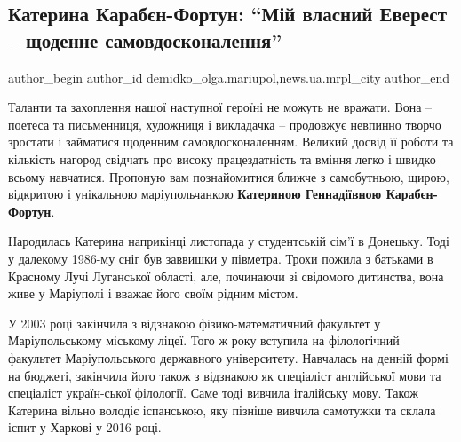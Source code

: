  
 
 
 
 
 
\subsection{Катерина Карабєн-Фортун: \enquote{Мій власний Еверест – щоденне самовдосконалення}}
\label{sec:27_08_2019.stz.news.ua.mrpl_city.1.kateryna_karaben_fortun}
 
\ifcmt
 author_begin
   author_id demidko_olga.mariupol,news.ua.mrpl_city
 author_end
\fi


Таланти та захоплення нашої наступної героїні не можуть не вражати. Вона –
поетеса та письменниця, художниця і викладачка – продовжує невпинно творчо
зростати і займатися щоденним самовдосконаленням. Великий досвід її роботи та
кількість нагород свідчать про високу працездатність та вміння легко і швидко
всьому навчатися. Пропоную вам познайомитися ближче з самобутньою, щирою,
відкритою і унікальною маріупольчанкою \textbf{Катериною Геннадіївною Карабєн-Фортун}.

Народилась Катерина наприкінці листопада у студентській сім'ї в Донецьку. Тоді
у далекому 1986-му сніг був заввишки у півметра. Трохи пожила з батьками в
Красному Лучі Луганської області, але, починаючи зі свідомого дитинства, вона
живе у Маріуполі і вважає його своїм рідним містом.

У 2003 році закінчила з відзнакою фізико-математичний факультет у
Маріупольському міському ліцеї. Того ж року вступила на філологічний факультет
Маріупольського державного університету. Навчалась на денній формі на бюджеті,
закінчила його також з відзнакою як спеціаліст англійської мови та спеціаліст
україн\hyp{}ської філології. Саме тоді вивчила італійську мову. Також Катерина вільно
володіє іспанською, яку пізніше вивчила самотужки та склала іспит у Харкові у
2016 році.

